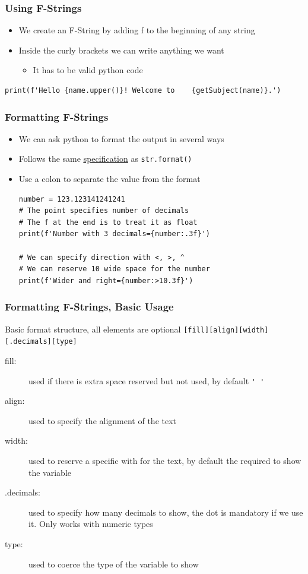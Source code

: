\documentclass[11pt]{beamer}
\begin{document}
\begin{frame}[fragile]\frametitle{Using F-Strings}
\begin{itemize}
\item We create an F-String by adding f to the beginning of any string
\item Inside the curly brackets we can write anything we want
    \begin{itemize}
    \item It has to be valid python code
    \end{itemize}
\end{itemize}
\begin{lstlisting}
print(f'Hello {name.upper()}! Welcome to    {getSubject(name)}.')
\end{lstlisting}
\end{frame}

\begin{frame}[fragile]\frametitle{Formatting F-Strings}
\begin{itemize}
\item We can ask python to format the output in several ways
\item Follows the same \href{https://docs.python.org/3/library/string.html#format-specification-mini-language}{\color{blue}\underline{specification}} as \lstinline|str.format()|
\item Use a colon to separate the value from the format
\begin{lstlisting}[basicstyle=\small]
number = 123.123141241241
# The point specifies number of decimals
# The f at the end is to treat it as float
print(f'Number with 3 decimals={number:.3f}')

# We can specify direction with <, >, ^
# We can reserve 10 wide space for the number
print(f'Wider and right={number:>10.3f}')
\end{lstlisting}
\end{itemize}
\end{frame}

\begin{frame}[fragile]\frametitle{Formatting F-Strings, Basic Usage}
\begin{block}{Basic format structure, all elements are optional}
\centering\verb|[fill][align][width][.decimals][type]|
\end{block}
\begin{description}
\item[fill:] used if there is extra space reserved but not used, by default \lstinline|' '|
\item[align:] used to specify the alignment of the text
\item[width:] used to reserve a specific with for the text, by default the required to show the variable
\item[.decimals:] used to specify how many decimals to show, the dot is mandatory if we use it. Only works with numeric types
\item[type:] used to coerce the type of the variable to show
\end{description}
\end{frame}
\end{document}
